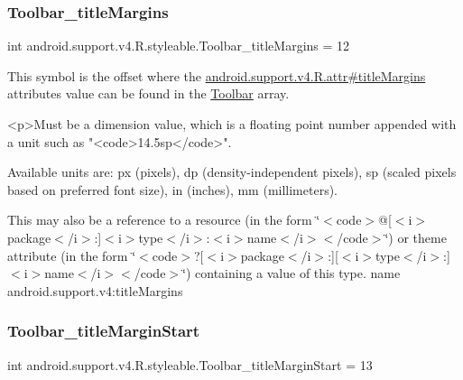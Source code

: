 \subsubsection{\texorpdfstring{Toolbar\+\_\+title\+Margins}{Toolbar\_titleMargins}}
{\footnotesize\ttfamily int android.\+support.\+v4.\+R.\+styleable.\+Toolbar\+\_\+title\+Margins = 12\hspace{0.3cm}{\ttfamily [static]}}

This symbol is the offset where the \hyperlink{classandroid_1_1support_1_1v4_1_1R_1_1attr_a68567d454e62f7fd26ab186363b999e8}{android.\+support.\+v4.\+R.\+attr\#title\+Margins} attribute\textquotesingle{}s value can be found in the \hyperlink{classandroid_1_1support_1_1v4_1_1R_1_1styleable_a211358a2f951023c7735caea0fb5ae04}{Toolbar} array.

\begin{DoxyVerb}      <p>Must be a dimension value, which is a floating point number appended with a unit such as "<code>14.5sp</code>".
\end{DoxyVerb}
 Available units are\+: px (pixels), dp (density-\/independent pixels), sp (scaled pixels based on preferred font size), in (inches), mm (millimeters). 

This may also be a reference to a resource (in the form \char`\"{}$<$code$>$@\mbox{[}$<$i$>$package$<$/i$>$\+:\mbox{]}$<$i$>$type$<$/i$>$\+:$<$i$>$name$<$/i$>$$<$/code$>$\char`\"{}) or theme attribute (in the form \char`\"{}$<$code$>$?\mbox{[}$<$i$>$package$<$/i$>$\+:\mbox{]}\mbox{[}$<$i$>$type$<$/i$>$\+:\mbox{]}$<$i$>$name$<$/i$>$$<$/code$>$\char`\"{}) containing a value of this type.  name android.\+support.\+v4\+:title\+Margins \mbox{\label{classandroid_1_1support_1_1v4_1_1R_1_1styleable_a879f1e4b1e7a561bfd7bcbcd1d237762}} 
\subsubsection{\texorpdfstring{Toolbar\+\_\+title\+Margin\+Start}{Toolbar\_titleMarginStart}}
{\footnotesize\ttfamily int android.\+support.\+v4.\+R.\+styleable.\+Toolbar\+\_\+title\+Margin\+Start = 13\hspace{0.3cm}{\ttfamily [static]}}

